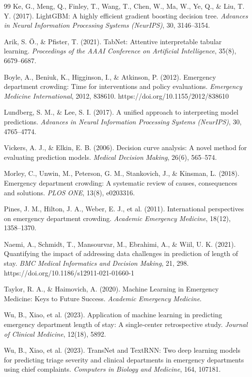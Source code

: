 \documentclass[harvard,article]{frontiersinFPHY_FAMS}
\begin{document}
\begin{thebibliography}{99}
 Ke, G., Meng, Q., Finley, T., Wang, T., Chen, W., Ma, W., Ye, Q., \& Liu, T. Y. (2017). LightGBM: A highly efficient gradient boosting decision tree. \textit{Advances in Neural Information Processing Systems (NeurIPS)}, 30, 3146--3154.

 Arik, S. \"O., \& Pfister, T. (2021). TabNet: Attentive interpretable tabular learning. \textit{Proceedings of the AAAI Conference on Artificial Intelligence}, 35(8), 6679--6687.

 Boyle, A., Beniuk, K., Higginson, I., \& Atkinson, P. (2012). Emergency department crowding: Time for interventions and policy evaluations. \textit{Emergency Medicine International}, 2012, 838610. https://doi.org/10.1155/2012/838610

 Lundberg, S. M., \& Lee, S. I. (2017). A unified approach to interpreting model predictions. \textit{Advances in Neural Information Processing Systems (NeurIPS)}, 30, 4765--4774.

 Vickers, A. J., \& Elkin, E. B. (2006). Decision curve analysis: A novel method for evaluating prediction models. \textit{Medical Decision Making}, 26(6), 565--574.

 Morley, C., Unwin, M., Peterson, G. M., Stankovich, J., \& Kinsman, L. (2018). Emergency department crowding: A systematic review of causes, consequences and solutions. \textit{PLOS ONE}, 13(8), e0203316.

 Pines, J. M., Hilton, J. A., Weber, E. J., et al. (2011). International perspectives on emergency department crowding. \textit{Academic Emergency Medicine}, 18(12), 1358--1370.

 Naemi, A., Schmidt, T., Mansourvar, M., Ebrahimi, A., \& Wiil, U. K. (2021). Quantifying the impact of addressing data challenges in prediction of length of stay. \textit{BMC Medical Informatics and Decision Making}, 21, 298. https://doi.org/10.1186/s12911-021-01660-1

 Taylor, R. A., \& Haimovich, A. (2020). Machine Learning in Emergency Medicine: Keys to Future Success. \textit{Academic Emergency Medicine}.

 Wu, B., Xiao, et al. (2023). Application of machine learning in predicting emergency department length of stay: A single-center retrospective study. \textit{Journal of Clinical Medicine}, 12(18), 5892.

 Wu, B., Xiao, et al. (2023). TransNet and TextRNN: Two deep learning models for predicting triage severity and clinical departments in emergency departments using chief complaints. \textit{Computers in Biology and Medicine}, 164, 107181.


\end{thebibliography}
\end{document}
